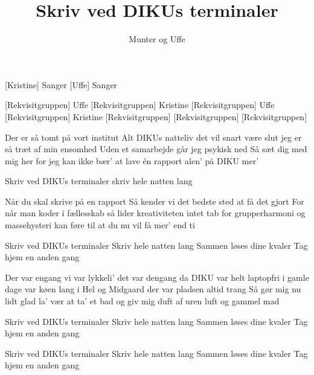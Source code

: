 \documentclass[a4paper,11pt]{article}
\title{Skriv ved DIKUs terminaler}
\author{Munter og Uffe}
\begin{document}
\maketitle

\begin{roles}  
[Kristine] Sanger
[Uffe] Sanger
\end{roles}

\begin{props}
[Rekvisitgruppen] Uffe
[Rekvisitgruppen] Kristine
[Rekvisitgruppen] Uffe
[Rekvisitgruppen] Kristine
[Rekvisitgruppen] 
[Rekvisitgruppen] 
[Rekvisitgruppen] 
\end{props}

\begin{song}
   Der er så tomt på vort institut
Alt DIKUs natteliv det vil snart være slut
jeg er så træt af min ensomhed
Uden et samarbejde går jeg psykisk ned
Så sæt dig med mig her
for jeg kan ikke bær'
at lave én rapport alen'
på DIKU mer'

 Skriv ved DIKUs terminaler
 skriv hele natten lang

 Når du skal skrive på en rapport
Så kender vi det bedste sted at få det gjort
For når man koder i fællesskab
så lider kreativiteten intet tab
for grupperharmoni
og massehysteri
kan føre til at du nu vil
få mer' end ti

Skriv ved DIKUs terminaler
Skriv hele natten lang
Sammen løses dine kvaler 
Tag hjem en anden gang 


 Der var engang vi var lykkeli'
det var dengang da DIKU var helt laptopfri
i gamle dage var køen lang
i Hel og Midgaard der var pladsen altid trang
Så gør mig nu lidt glad
la' vær at ta' et bad
og giv mig duft af uren luft
og gammel mad

 Skriv ved DIKUs terminaler
Skriv hele natten lang
Sammen løses dine kvaler
Tag hjem en anden gang

 Skriv ved DIKUs terminaler
Skriv hele natten lang
Sammen løses dine kvaler
Tag hjem en anden gang

\end{song}
\end{document}
